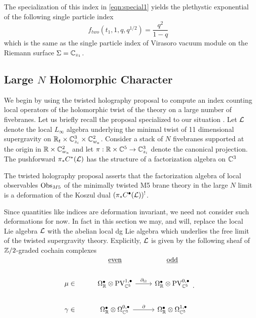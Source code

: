 \documentclass[11pt]{amsart}
\begin{document}
\parsec[]

The specialization of this index in \eqref{eqn:special1} yields the plethystic exponential of the following single particle index
\[
f_{two}(t_1, 1, q, q^{1/2}) = \frac{q^2}{1-q} 
\]
which is the same as the single particle index of Virasoro vacuum module on the Riemann surface $\Sigma = \mathbb{C}_{z_1}$. 

\subsection{Large $N$ Holomorphic Character}

We begin by using the twisted holography proposal to compute an index counting local operators of the holomorphic twist of the theory on a large number of fivebranes. Let us briefly recall the proposal specialized to our situation . Let $\mathcal L$ denote the local $L_{\infty}$ algebra underlying the minimal twist of 11 dimensional supergravity on $\mathbb{R}_{t}\times \mathbb{C}^{3}_{z_{i}}\times \mathbb{C}^{2}_{w_{a}}$. Consider a stack of $N$ fivebranes supported at the origin in $\mathbb{R}\times \mathbb{C}^{2}_{w_{a}}$ and let $\pi : \mathbb{R}\times \mathbb{C}^{5}\to \mathbb{C}^{3}_{z_{i}}$ denote the canonical projection. The pushforward $\pi_{*} C^{*}(\mathcal L)$ has the structure of a factorization algebra on $\mathbb{C}^{3}$

The twisted holography proposal asserts that the factorization algebra of local observables ${\rm Obs}_{M5}$ of the minimally twisted M5 brane theory in the large $N$ limit is a deformation of the Koszul dual $(\pi_{*} C^{\bullet}(\mathcal L))^{!}$.

Since quantities like indices are deformation invariant, we need not consider such deformations for now. In fact in this section we may, and will, replace the local Lie algebra $\mathcal L$ with the abelian local dg Lie algebra which underlies the free limit of the twisted supergravity theory.
Explicitly, $\mathcal L$ is given by the following sheaf of $\mathbb{Z}/2$-graded cochain complexes
\[
\begin{tikzcd}
  &  \ul{\rm even} & \ul{\rm odd} \\
 \mu \in & \Omega^{\bullet}_{\R}\otimes\PV^{1,\bullet}_{\C^{5}} \ar[r, "\del_{\Omega}"] & \Omega^{\bullet}_{\R}\otimes\PV^{0,\bullet}_{\C^{5}}\\
 \gamma \in & \Omega^{\bullet}_{\R}\otimes\Omega^{0,\bullet}_{\C^{5}} \ar[r, "\del"]
& \Omega^{\bullet}_{\R}\otimes\Omega^{1,\bullet}_{\C^{5}}\end{tikzcd}
.\]


\parsec
\end{document}
